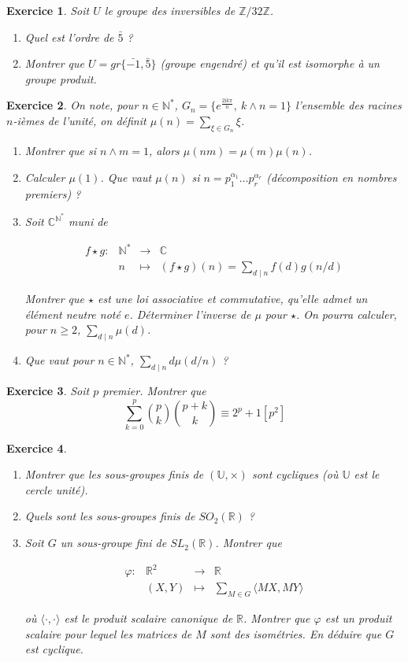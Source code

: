 \documentclass[12pt]{article}
\newtheorem{exercise}{Exercice}[section]
\theoremstyle{remark}
\theoremstyle{remark}
\newcommand{\R}{\mathbb{R}}
\newcommand{\C}{\mathbb{C}}
\newcommand{\N}{\mathbb{N}}
\newcommand{\Z}{\mathbb{Z}}
\newcommand{\U}{\mathbb{U}}
\newcommand{\function}[5]{
	$$
	\begin{array}{rccl}
		#1: & #2 & \to & #3 \\
		& #4 & \mapsto & #5
	\end{array}
	$$
}
\begin{document}
\begin{exercise}
	Soit $U$ le groupe des inversibles de $\Z/32\Z$.
	\begin{enumerate}
		\item Quel est l'ordre de $\bar{5}$ ?
		\item Montrer que $U=gr\{\bar{-1},\bar{5}\}$ (groupe engendré) et qu'il
		est isomorphe à un groupe produit.
	\end{enumerate}
\end{exercise}

\begin{exercise}
	On note, pour $n\in\N^{*}$, $G_{n}=\{e^{\frac{2\mathrm{i}k\pi}{n}},~k\wedge n=1\}$
	l'ensemble des racines $n$-ièmes de l'unité, on définit $\mu(n)=\sum_{\xi\in
	G_{n}}\xi$.
	\begin{enumerate}
		\item Montrer que si $n\wedge m=1$, alors $\mu(nm)=\mu(m)\mu(n)$.
		\item Calculer $\mu(1)$. Que vaut $\mu(n)$ si
		$n=p_{1}^{\alpha_{1}}\dots p_{r}^{\alpha_{r}}$ (décomposition en nombres
		premiers) ?
		\item Soit $\C^{\N^{*}}$ muni de 
		\function{f\star g}{\N^*}{\C}{n}{(f\star g)(n)=\sum_{d\mid n}f(d)g(n/d)}
		Montrer que $\star$ est une loi associative et commutative, qu'elle
		admet un élément neutre noté $e$. Déterminer l'inverse de $\mu$ pour
		$\star$. On pourra calculer, pour $n\geqslant2$, $\sum_{d\mid n}\mu(d)$.
		\item Que vaut pour $n\in\N^{*}$, $\sum_{d\mid n}d\mu(d/n)$ ?
	\end{enumerate}
\end{exercise}

\begin{exercise}
	Soit $p$ premier. Montrer que
	$$\sum_{k=0}^{p}\binom{p}{k}\binom{p+k}{k}\equiv 2^{p}+1[p^{2}]$$
\end{exercise}

\begin{exercise}
	\phantom{}
	\begin{enumerate}
		\item Montrer que les sous-groupes finis de $(\U,\times)$ sont cycliques
		(où $\U$ est le cercle unité).
		\item Quels sont les sous-groupes finis de $SO_{2}(\R)$ ?
		\item Soit $G$ un sous-groupe fini de $SL_{2}(\R)$. Montrer que 
		\function{\varphi}{\R^2}{\R}{(X,Y)}{\sum_{M\in G}\langle MX,MY\rangle}
		où $\langle\cdot,\cdot\rangle$ est le produit scalaire canonique de
		$\R$. Montrer que $\varphi$ est un produit scalaire pour lequel les
		matrices de $M$ sont des isométries. En déduire que $G$ est cyclique.
	\end{enumerate}
\end{exercise}
\end{document}
